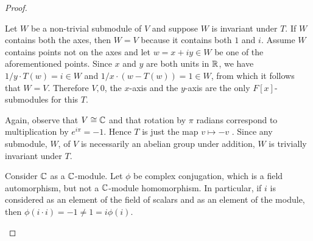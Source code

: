 \documentclass[10pt]{amsart}
\begin{document}
\begin{thm}
\begin{proof}
\begin{alphaenum}
        Let $W$ be a non-trivial submodule of $V$  and suppose $W$ is invariant under $T$.
        If $W$ contains both the axes, then $W = V$ because it contains both $1$ and $i$.
        Assume $W$ contains points not on the axes and let $w = x + iy \in W$ be one of the aforementioned points.
        Since $x$ and $y$ are both units in $\mathbb{R}$, we have $1/y \cdot T(w) = i \in W$ and $1/x \cdot (w - T(w)) = 1\in W$, from which it follows that $W = V$.
        Therefore  $V,0$, the $x$-axis and the $y$-axis are the only $F[x]$-submodules for this $T$.
      \item
        Again, observe that $V \cong \mathbb{C}$ and that rotation by $\pi$ radians correspond to multiplication by $e^{i\pi} = -1$.
        Hence $T$ is just the map $v \mapsto -v$ .
        Since any submodule, $W$, of $V$ is necessarily an abelian group under addition, $W$ is trivially invariant under $T$.
      \item
        Consider $\mathbb{C}$ as a $\mathbb{C}$-module.  
        Let $\phi$ be complex conjugation, which is a field automorphism, but not a $\mathbb{C}$-module homomorphism.
        In particular, if $i$ is considered as an element of the field of scalars and as an element of the module, then $\phi(i\cdot i) = -1 \not = 1 = i\phi(i) $.
      \end{alphaenum}
    \end{proof}
\end{thm}
\end{document}
